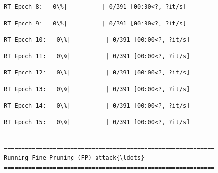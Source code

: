 \documentclass[11pt]{article}
\begin{document}
    \begin{Verbatim}[commandchars=\\\{\}]
RT Epoch 8:   0\%|          | 0/391 [00:00<?, ?it/s]
    \end{Verbatim}

    
    
    \begin{Verbatim}[commandchars=\\\{\}]
RT Epoch 9:   0\%|          | 0/391 [00:00<?, ?it/s]
    \end{Verbatim}

    
    
    \begin{Verbatim}[commandchars=\\\{\}]
RT Epoch 10:   0\%|          | 0/391 [00:00<?, ?it/s]
    \end{Verbatim}

    
    
    \begin{Verbatim}[commandchars=\\\{\}]
RT Epoch 11:   0\%|          | 0/391 [00:00<?, ?it/s]
    \end{Verbatim}

    
    
    \begin{Verbatim}[commandchars=\\\{\}]
RT Epoch 12:   0\%|          | 0/391 [00:00<?, ?it/s]
    \end{Verbatim}

    
    
    \begin{Verbatim}[commandchars=\\\{\}]
RT Epoch 13:   0\%|          | 0/391 [00:00<?, ?it/s]
    \end{Verbatim}

    
    
    \begin{Verbatim}[commandchars=\\\{\}]
RT Epoch 14:   0\%|          | 0/391 [00:00<?, ?it/s]
    \end{Verbatim}

    
    
    \begin{Verbatim}[commandchars=\\\{\}]
RT Epoch 15:   0\%|          | 0/391 [00:00<?, ?it/s]
    \end{Verbatim}

    
    \begin{Verbatim}[commandchars=\\\{\}]

============================================================
Running Fine-Pruning (FP) attack{\ldots}
============================================================
    \end{Verbatim}
\end{document}

